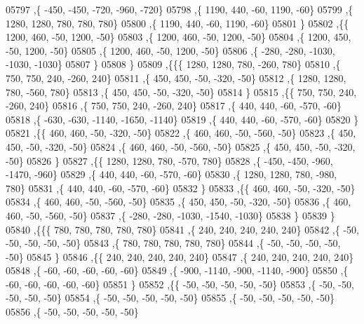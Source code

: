 \begin{DoxyCode}
05797     ,\{  -450,  -450,  -720,  -960,  -720\}
05798     ,\{  1190,   440,   -60,  1190,   -60\}
05799     ,\{  1280,  1280,   780,   780,   780\}
05800     ,\{  1190,   440,   -60,  1190,   -60\}
05801     \}
05802    ,\{\{  1200,   460,   -50,  1200,   -50\}
05803     ,\{  1200,   460,   -50,  1200,   -50\}
05804     ,\{  1200,   450,   -50,  1200,   -50\}
05805     ,\{  1200,   460,   -50,  1200,   -50\}
05806     ,\{  -280,  -280, -1030, -1030, -1030\}
05807     \}
05808    \}
05809   ,\{\{\{  1280,  1280,   780,  -260,   780\}
05810     ,\{   750,   750,   240,  -260,   240\}
05811     ,\{   450,   450,   -50,  -320,   -50\}
05812     ,\{  1280,  1280,   780,  -560,   780\}
05813     ,\{   450,   450,   -50,  -320,   -50\}
05814     \}
05815    ,\{\{   750,   750,   240,  -260,   240\}
05816     ,\{   750,   750,   240,  -260,   240\}
05817     ,\{   440,   440,   -60,  -570,   -60\}
05818     ,\{  -630,  -630, -1140, -1650, -1140\}
05819     ,\{   440,   440,   -60,  -570,   -60\}
05820     \}
05821    ,\{\{   460,   460,   -50,  -320,   -50\}
05822     ,\{   460,   460,   -50,  -560,   -50\}
05823     ,\{   450,   450,   -50,  -320,   -50\}
05824     ,\{   460,   460,   -50,  -560,   -50\}
05825     ,\{   450,   450,   -50,  -320,   -50\}
05826     \}
05827    ,\{\{  1280,  1280,   780,  -570,   780\}
05828     ,\{  -450,  -450,  -960, -1470,  -960\}
05829     ,\{   440,   440,   -60,  -570,   -60\}
05830     ,\{  1280,  1280,   780,  -980,   780\}
05831     ,\{   440,   440,   -60,  -570,   -60\}
05832     \}
05833    ,\{\{   460,   460,   -50,  -320,   -50\}
05834     ,\{   460,   460,   -50,  -560,   -50\}
05835     ,\{   450,   450,   -50,  -320,   -50\}
05836     ,\{   460,   460,   -50,  -560,   -50\}
05837     ,\{  -280,  -280, -1030, -1540, -1030\}
05838     \}
05839    \}
05840   ,\{\{\{   780,   780,   780,   780,   780\}
05841     ,\{   240,   240,   240,   240,   240\}
05842     ,\{   -50,   -50,   -50,   -50,   -50\}
05843     ,\{   780,   780,   780,   780,   780\}
05844     ,\{   -50,   -50,   -50,   -50,   -50\}
05845     \}
05846    ,\{\{   240,   240,   240,   240,   240\}
05847     ,\{   240,   240,   240,   240,   240\}
05848     ,\{   -60,   -60,   -60,   -60,   -60\}
05849     ,\{  -900, -1140,  -900, -1140,  -900\}
05850     ,\{   -60,   -60,   -60,   -60,   -60\}
05851     \}
05852    ,\{\{   -50,   -50,   -50,   -50,   -50\}
05853     ,\{   -50,   -50,   -50,   -50,   -50\}
05854     ,\{   -50,   -50,   -50,   -50,   -50\}
05855     ,\{   -50,   -50,   -50,   -50,   -50\}
05856     ,\{   -50,   -50,   -50,   -50,   -50\}

\end{DoxyCode}
